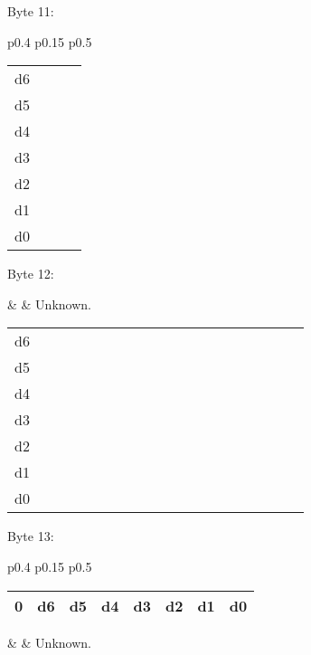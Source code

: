 Byte 11:

\begin{tabular}{p{0.4\linewidth} p{0.15\linewidth} p{0.5\linewidth}} 

\begin{tabular}{|p{0.3cm}|p{0.3cm}|p{0.3cm}|p{0.3cm}|p{0.3cm}|p{0.3cm}|p{0.3cm}|p{0.3cm}|}
\hline
0 & d6 & d5 & d4 & d3 & d2 & d1 & d0\\
\hline
\end{tabular}
&  & Unknown.\\
\end{tabular}

\begin{tabular}{p{0.05\linewidth} p{0.6\linewidth}} 
d6 & \\
d5 & \\
d4 & \\
d3 & \\
d2 & \\
d1 & \\
d0 & \\
\end{tabular}

Byte 12:

&  & Unknown.\\
\end{tabular}

\begin{tabular}{p{0.05\linewidth} p{0.6\linewidth}} 
d6 & \\
d5 & \\
d4 & \\
d3 & \\
d2 & \\
d1 & \\
d0 & \\
\end{tabular}

Byte 13:

\begin{tabular}{p{0.4\linewidth} p{0.15\linewidth} p{0.5\linewidth}} 

\begin{tabular}{|p{0.3cm}|p{0.3cm}|p{0.3cm}|p{0.3cm}|p{0.3cm}|p{0.3cm}|p{0.3cm}|p{0.3cm}|}
\hline
0 & d6 & d5 & d4 & d3 & d2 & d1 & d0\\
\hline
\end{tabular}
&  & Unknown.\\
\end{tabular}

